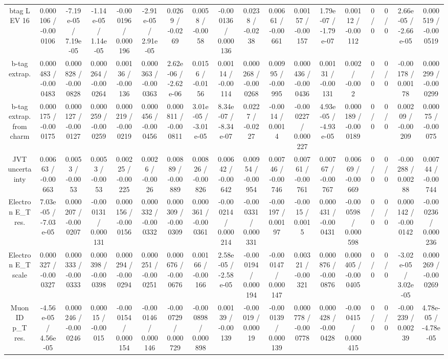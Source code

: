 \documentclass[10pt]{article}
\begin{document}
\begin{table}[htbp]
\begin{center}
\begin{tabular}{|c|c|c|c|c|c|c|c|c|c|c|c|c|c|c|c|c|c|}
  btag L EV 16 & 0.000106 / -0.000106 & -7.19e-05 / 7.19e-05 & -1.14e-05 / 1.14e-05 & -0.000196 / 0.000196 & -2.91e-05 / 2.91e-05 & 0.0269 / -0.0269 & 0.0058 / -0.0058 & -0.000136 / 0.000136 & 0.0238 / -0.0238 & 0.00661 / -0.00661 & 0.00157 / -0.00157 & 1.79e-07 / -1.79e-07 & 0.00112 / -0.00112 & 0 / 0 & 0 / 0 & 2.66e-05 / -2.66e-05 & 0.000519 / -0.000519 \\ 
  b-tag extrap. & 0.000483 / -0.000483 & 0.000828 / -0.000828 & 0.000264 / -0.000264 & 0.00136 / -0.00136 & 0.000363 / -0.000363 & 2.62e-06 / -2.62e-06 & 0.0156 / -0.0156 & 0.00114 / -0.00114 & 0.000268 / -0.000268 & 0.00995 / -0.00995 & 0.000436 / -0.000436 & 0.00131 / -0.00131 & 0.002 / -0.002 & 0 / 0 & 0 / 0 & -0.00178 / 0.00178 & 0.000299 / -0.000299 \\ 
  b-tag extrap. from charm & 0.000175 / -0.000175 & 0.000127 / -0.000127 & 0.000259 / -0.000259 & 0.000219 / -0.000219 & 0.000456 / -0.000456 & 0.000811 / -0.000811 & 3.01e-05 / -3.01e-05 & 8.34e-07 / -8.34e-07 & 0.0227 / -0.0227 & -0.0014 / 0.0014 & -0.000227 / 0.000227 & 4.93e-05 / -4.93e-05 & 0.000189 / -0.000189 & 0 / 0 & 0 / 0 & 0.00209 / -0.00209 & 0.00075 / -0.00075 \\ 
  JVT uncertainty & 0.00663 / -0.00663 & 0.0053 / -0.0053 & 0.0053 / -0.0053 & 0.00225 / -0.00225 & 0.0026 / -0.0026 & 0.00889 / -0.00889 & 0.00826 / -0.00826 & 0.00642 / -0.00642 & 0.00954 / -0.00954 & 0.00746 / -0.00746 & 0.00761 / -0.00761 & 0.00767 / -0.00767 & 0.00669 / -0.00669 & 0 / 0 & 0 / 0 & -0.00288 / 0.00288 & 0.00744 / -0.00744 \\ 
  Electron E_{T} res. & 7.03e-05 / -7.03e-05 & 0.000207 / -0.000207 & -0.000131 / 0.000131 & 0.000156 / -0.000156 & 0.000332 / -0.000332 & 0.000309 / -0.000309 & 0.000361 / -0.000361 & -0.000214 / 0.000214 & -0.000331 / 0.000331 & -0.00197 / 0.00197 & -0.0015 / 0.0015 & 0.000431 / -0.000431 & -0.000598 / 0.000598 & 0 / 0 & 0 / 0 & 0.000142 / -0.000142 & -0.000236 / 0.000236 \\ 
  Electron E_{T} scale & 0.000327 / -0.000327 & 0.000333 / -0.000333 & 0.000398 / -0.000398 & 0.000294 / -0.000294 & 0.000251 / -0.000251 & 0.000676 / -0.000676 & 0.00166 / -0.00166 & 2.58e-05 / -2.58e-05 & -0.000194 / 0.000194 & -0.000147 / 0.000147 & 0.00321 / -0.00321 & 0.000876 / -0.000876 & 0.000405 / -0.000405 & 0 / 0 & 0 / 0 & -3.02e-05 / 3.02e-05 & 0.000269 / -0.000269 \\ 
  Muon ID p_{T} res. & -4.56e-05 / 4.56e-05 & 0.000246 / -0.000246 & 0.00015 / -0.00015 & -0.000154 / 0.000154 & -0.000146 / 0.000146 & -0.000729 / 0.000729 & -0.000898 / 0.000898 & 0.00139 / -0.00139 & -0.00019 / 0.00019 & -0.000139 / 0.000139 & 0.000778 / -0.000778 & 0.000428 / -0.000428 & -0.000415 / 0.000415 & 0 / 0 & 0 / 0 & -0.00239 / 0.00239 & 4.78e-05 / -4.78e-05 \\ 

\end{tabular}
\end{center}
\end{table}
\end{document}
